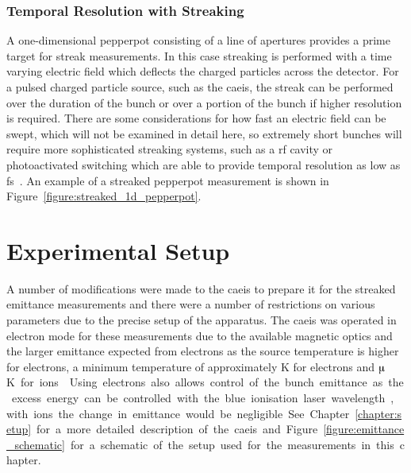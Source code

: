 \subsubsection{Temporal Resolution with Streaking}
A one-dimensional pepperpot consisting of a line of apertures provides a prime target for streak measurements.
In this case streaking is performed with a time varying electric field which deflects the charged particles across the detector.
For a pulsed charged particle source, such as the \gls{caeis}, the streak can be performed over the duration of the bunch or over a portion of the bunch if higher resolution is required.
There are some considerations for how fast an electric field can be swept, which will not be examined in detail here, so extremely short bunches will require more sophisticated streaking systems, such as a \gls{rf} cavity or photoactivated switching which are able to provide temporal resolution as low as \unit[100]{fs}~\cite{li_note:_2010,kassier_compact_2010,van_rens_theory_2018}.
An example of a streaked pepperpot measurement is shown in Figure~\ref{figure:streaked_1d_pepperpot}.

\section{Experimental Setup}

A number of modifications were made to the \gls{caeis} to prepare it for the streaked emittance measurements and there were a number of restrictions on various parameters due to the precise setup of the apparatus.
The \gls{caeis} was operated in electron mode for these measurements due to the available magnetic optics and the larger emittance expected from electrons as the source temperature is higher for electrons, a minimum temperature of approximately \unit[10]{K} for electrons and \unit[100]{$\muup$K} for ions~\cite{saliba_spatial_2012}.
Using electrons also allows control of the bunch emittance as the excess energy can be controlled with the blue ionisation laser wavelength, with ions the change in emittance would be negligible.

See Chapter~\ref{chapter:setup} for a more detailed description of the \gls{caeis} and Figure~\ref{figure:emittance_schematic} for a schematic of the setup used for the measurements in this chapter.

